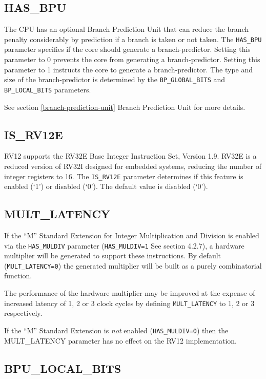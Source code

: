 \subsection{HAS\_BPU}\label{has_bpu}

The CPU has an optional Branch Prediction Unit that can reduce the
branch penalty considerably by prediction if a branch is taken or not
taken. The \texttt{HAS\_BPU} parameter specifies if the core should generate a
branch-predictor. Setting this parameter to 0 prevents the core from
generating a branch-predictor. Setting this parameter to 1 instructs the
core to generate a branch-predictor. The type and size of the
branch-predictor is determined by the \texttt{BP\_GLOBAL\_BITS} and
\texttt{BP\_LOCAL\_BITS} parameters.

See section \ref{branch-prediction-unit} Branch Prediction Unit for more details.

\subsection{IS\_RV12E}\label{is_rv12e}

RV12 supports the RV32E Base Integer Instruction Set, Version 1.9. RV32E
is a reduced version of RV32I designed for embedded systems, reducing
the number of integer registers to 16. The \texttt{IS\_RV12E} parameter
determines if this feature is enabled (`1') or disabled (`0'). The
default value is disabled (`0').

\subsection{MULT\_LATENCY}\label{mult_latency}

If the ``M'' Standard Extension for Integer Multiplication and Division
is enabled via the \texttt{HAS\_MULDIV} parameter (\texttt{HAS\_MULDIV=1} See section
4.2.7), a hardware multiplier will be generated to support these
instructions. By default (\texttt{MULT\_LATENCY=0}) the generated multiplier will
be built as a purely combinatorial function.

The performance of the hardware multiplier may be improved at the
expense of increased latency of 1, 2 or 3 clock cycles by defining
\texttt{MULT\_LATENCY} to 1, 2 or 3 respectively.

If the ``M'' Standard Extension is \emph{not} enabled (\texttt{HAS\_MULDIV=0})
then the MULT\_LATENCY parameter has no effect on the RV12
implementation.

\subsection{BPU\_LOCAL\_BITS}\label{bpu_local_bits}

